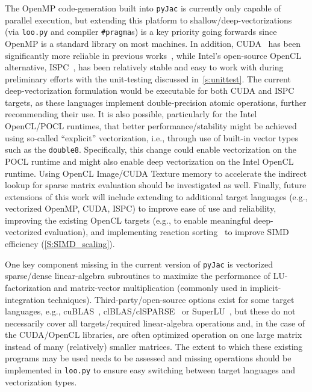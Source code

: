 \documentclass[12pt,number,sort&compress,preprint]{elsarticle}
\begin{document}
The OpenMP code-generation built into \texttt{pyJac} is currently only capable of parallel execution, but extending this platform to shallow\slash deep-vectorizations (via \texttt{loo.py} and compiler \texttt{\#pragma}s) is a key priority going forwards since OpenMP is a standard library on most machines.
In addition, CUDA~\cite{Nvidia:2018} has been significantly more reliable in previous works~\cite{Niemeyer:2016aa,CurtisGPU:2017}, while Intel's open-source OpenCL alternative, ISPC~\cite{pharr2012ispc}, has been relatively stable and easy to work with during preliminary efforts with the unit-testing discussed in~\cref{s:unittest}.
The current deep-vectorization formulation would be executable for both CUDA and ISPC targets, as these languages implement double-precision atomic operations, further recommending their use.
It is also possible, particularly for the Intel OpenCL\slash POCL runtimes, that better performance\slash stability might be achieved using so-called ``explicit'' vectorization, i.e., through use of built-in vector types such as the \texttt{double8}.
Specifically, this change could enable vectorization on the POCL runtime and might also enable deep vectorization on the Intel OpenCL runtime.
Using OpenCL Image\slash CUDA Texture memory to accelerate the indirect lookup for sparse matrix evaluation should be investigated as well.
Finally, future extensions of this work will include extending to additional target languages (e.g., vectorized OpenMP, CUDA, ISPC) to improve ease of use and reliability, improving the existing OpenCL targets (e.g., to enable meaningful deep-vectorized evaluation), and implementing reaction sorting~\cite{Sewerin20151375} to improve SIMD efficiency (\cref{S:SIMD_scaling}).

One key component missing in the current version of \texttt{pyJac} is vectorized sparse\slash dense linear-algebra subroutines to maximize the performance of LU-factorization and matrix-vector multiplication (commonly used in implicit-integration techniques).
Third-party\slash open-source options exist for some target languages, e.g., cuBLAS~\cite{cublas}, clBLAS\slash clSPARSE~\cite{clmath} or SuperLU~\cite{superlu99}, but these do not necessarily cover all targets\slash required linear-algebra operations and, in the case of the CUDA\slash OpenCL libraries, are often optimized operation on one large matrix instead of many (relatively) smaller matrices.
The extent to which these existing programs may be used needs to be assessed and missing operations should be implemented in \texttt{loo.py} to ensure easy switching between target languages and vectorization types.
\end{document}
